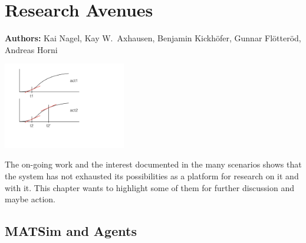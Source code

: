\chapter{Research Avenues}
\label{ch:researchavenues}

\hfill \textbf{Authors:} Kai Nagel, Kay W.\ Axhausen, Benjamin Kickhöfer, Gunnar Flötteröd, Andreas Horni

\begin{center} \includegraphics[width=0.4\textwidth, angle=0]{figures/stable-activity-allocations} \end{center}

The on-going work and the interest documented in the many scenarios shows 
that the system has not exhausted its possibilities as a platform for research on it and with it. 
This chapter wants to highlight some of them for further discussion and maybe action. 

\section{MATSim and Agents}
\label{sec:matsim-and-agents}


%
%



